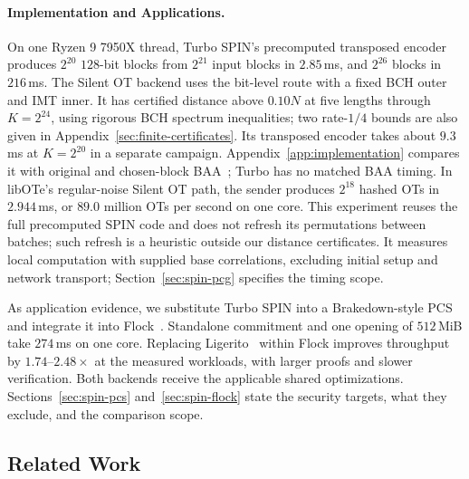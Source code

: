 \paragraph{Implementation and Applications.}
On one Ryzen 9 7950X thread, Turbo SPIN's precomputed transposed encoder
produces $2^{20}$ $128$-bit blocks from $2^{21}$ input blocks in $2.85$\,ms,
and $2^{26}$ blocks in $216$\,ms.
The Silent OT backend uses the bit-level route with a fixed BCH outer
and IMT inner. It has certified distance above $0.10N$ at five lengths
through $K=2^{24}$, using rigorous BCH spectrum inequalities; two
rate-$1/4$ bounds are also given in Appendix~\ref{sec:finite-certificates}.
Its transposed encoder takes about $9.3$\,ms at $K=2^{20}$ in a separate
campaign. Appendix~\ref{app:implementation} compares it
with original and chosen-block BAA~\cite{KolesnikovEtAl2026BA,cryptoeprint:2026/1903};
Turbo has no matched BAA timing.
In libOTe's regular-noise Silent OT path, the sender produces $2^{18}$ hashed
OTs in $2.944$\,ms, or $89.0$ million OTs per second on one core.
This experiment reuses the full precomputed SPIN code and does not refresh
its permutations between batches; such refresh is a heuristic outside our
distance certificates.
It measures local computation with supplied base correlations,
excluding initial setup and network transport; Section~\ref{sec:spin-pcg}
specifies the timing scope.

As application evidence, we substitute Turbo SPIN into a Brakedown-style
PCS~\cite{brakedown23} and integrate it into Flock~\cite{flock26}.
Standalone commitment and one opening of $512$\,MiB take $274$\,ms on one
core. Replacing Ligerito~\cite{ligerito25} within Flock improves throughput
by $1.74$--$2.48\times$ at the measured workloads, with larger proofs and
slower verification. Both backends receive the applicable shared
optimizations. Sections~\ref{sec:spin-pcs} and~\ref{sec:spin-flock}
state the security targets, what they exclude, and the comparison scope.

\subsection{Related Work}


